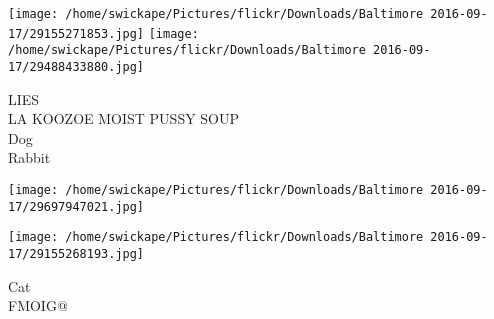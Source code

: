\documentclass[10pt,letterpaper]{article}
\begin{document}
\texttt{[image: /home/swickape/Pictures/flickr/Downloads/Baltimore 2016-09-17/29155271853.jpg]}
\texttt{[image: /home/swickape/Pictures/flickr/Downloads/Baltimore 2016-09-17/29488433880.jpg]}

LIES\\
LA KOOZOE MOIST PUSSY SOUP\\
Dog\\
Rabbit
\pagebreak

\texttt{[image: /home/swickape/Pictures/flickr/Downloads/Baltimore 2016-09-17/29697947021.jpg]}

\vspace{0.25in}
\texttt{[image: /home/swickape/Pictures/flickr/Downloads/Baltimore 2016-09-17/29155268193.jpg]}

Cat\\
FMOIG@
\pagebreak
\end{document}
